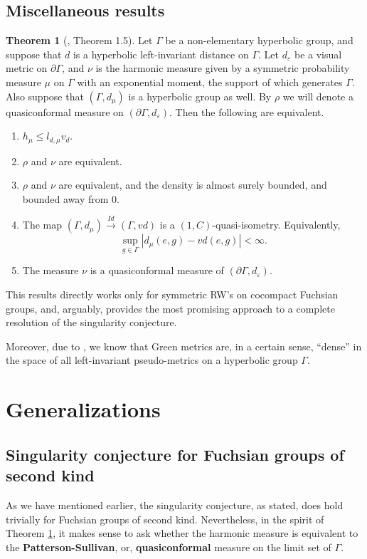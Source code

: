 \documentclass[11pt]{amsart}
\theoremstyle{definition}
\newtheorem{theorem}{Theorem}[section]
\begin{document}
	\subsection{Miscellaneous results}
	\begin{theorem}[\cite{blachere2011harmonic}, Theorem 1.5]
		\label{BHMTheorem 1.4}
		Let $\Gamma$ be a non-elementary hyperbolic group, and suppose that $d$ is a hyperbolic left-invariant distance on $\Gamma$. Let $d_\varepsilon$ be a visual metric on $\partial \Gamma$, and $\nu$ is the harmonic measure given by a symmetric probability measure $\mu$ on $\Gamma$ with an exponential moment, the support of which generates $\Gamma$. Also suppose that $(\Gamma, d_\mu)$ is a hyperbolic group as well. By $\rho$ we will denote a quasiconformal measure on $(\partial \Gamma, d_\varepsilon)$. Then the following are equivalent.
		\begin{enumerate}
			\item $h_{\mu} \le l_{d, \mu} v_d$.
			\item $\rho$ and $\nu$ are equivalent.
			\item $\rho$ and $\nu$ are equivalent, and the density is almost surely bounded, and bounded away from 0.
			\item The map $(\Gamma, d_\mu) \xrightarrow{Id} (\Gamma, vd)$ is a $(1, C)$-quasi-isometry. Equivalently,
			\[
			\sup_{g \in \Gamma} |d_\mu(e, g) - vd(e, g)| < \infty.
			\]
			\item The measure $\nu$ is a quasiconformal measure of $(\partial \Gamma, d_\varepsilon)$.
		\end{enumerate}
	\end{theorem}
	This results directly works only for symmetric RW's on cocompact Fuchsian groups, and, arguably, provides the most promising approach to a complete resolution of the singularity conjecture.
	
	Moreover, due to \cite[Theorem 1.1]{cantrell2023manhattan}, we know that Green metrics are, in a certain sense, ``dense'' in the space of all left-invariant pseudo-metrics on a hyperbolic group $\Gamma$.
	
	\section{Generalizations}
	\subsection{Singularity conjecture for Fuchsian groups of second kind}
	As we have mentioned earlier, the singularity conjecture, as stated, does hold trivially for Fuchsian groups of second kind. Nevertheless, in the spirit of Theorem \ref{BHMTheorem 1.4}, it makes sense to ask whether the harmonic measure is equivalent to the \textbf{Patterson-Sullivan}, or, \textbf{quasiconformal} measure on the limit set of $\Gamma$.
	
\end{document}
